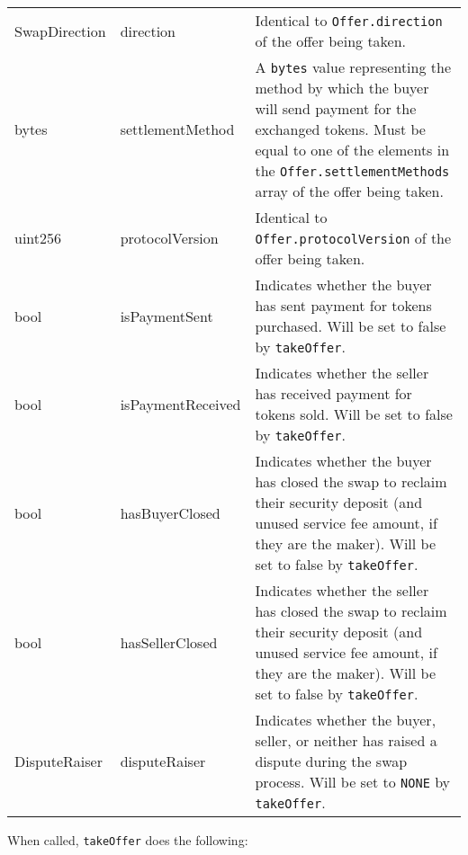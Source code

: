 \documentclass[11pt]{article}
\begin{document}
\begin{longtable}[p]{ |p{2.5cm}|p{4cm}|p{7cm}| }
        SwapDirection & direction & Identical to \verb|Offer.direction| of the offer being taken. \\
        bytes & settlementMethod & A \verb|bytes| value representing the method by which the buyer will send payment for the exchanged tokens.
            Must be equal to one of the elements in the \verb|Offer.settlementMethods| array of the offer being taken. \\
        uint256 & protocolVersion & Identical to \verb|Offer.protocolVersion| of the offer being taken. \\
        bool & isPaymentSent & Indicates whether the buyer has sent payment for tokens purchased.
            Will be set to false by \verb|takeOffer|. \\
        bool & isPaymentReceived & Indicates whether the seller has received payment for tokens sold.
            Will be set to false by \verb|takeOffer|. \\
        bool & hasBuyerClosed & Indicates whether the buyer has closed the swap to reclaim their security deposit (and unused service fee amount, if they are the maker).
            Will be set to false by \verb|takeOffer|. \\
        bool & hasSellerClosed & Indicates whether the seller has closed the swap to reclaim their security deposit (and unused service fee amount, if they are the maker).
            Will be set to false by \verb|takeOffer|. \\
        DisputeRaiser & disputeRaiser & Indicates whether the buyer, seller, or neither has raised a dispute during the swap process.
            Will be set to \verb|NONE| by \verb|takeOffer|. \\
        \hline
    \end{longtable}

    When called, \verb|takeOffer| does the following:
\end{document}
